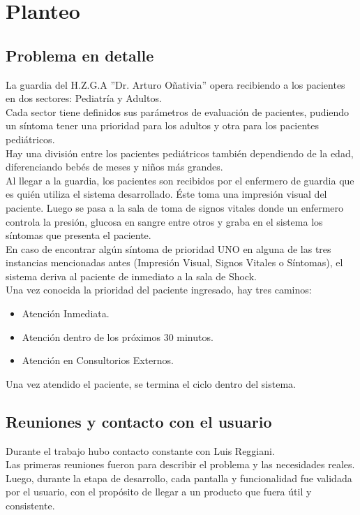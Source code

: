 \section{Planteo}
\subsection{Problema en detalle}
La guardia del H.Z.G.A ''Dr. Arturo Oñativia'' opera recibiendo a los pacientes en dos sectores: Pediatría y Adultos. \\
Cada sector tiene definidos sus parámetros de evaluación de pacientes, pudiendo un síntoma tener una prioridad para los adultos y otra para los pacientes pediátricos.\\
Hay una división entre los pacientes pediátricos también dependiendo de la edad, diferenciando bebés de meses y niños más grandes.\\
Al llegar a la guardia, los pacientes son recibidos por el enfermero de guardia que es quién utiliza el sistema desarrollado. Éste toma una impresión visual del paciente. Luego se pasa a la sala de toma de signos vitales donde un enfermero controla la presión, glucosa en sangre entre otros y graba en el sistema los síntomas que presenta el paciente. \\
En caso de encontrar algún síntoma de prioridad UNO en alguna de las tres instancias mencionadas antes (Impresión Visual, Signos Vitales o Síntomas), el sistema deriva al paciente de inmediato a la sala de Shock.  \\
Una vez conocida la prioridad del paciente ingresado, hay tres caminos: \\
\begin{itemize}
\item Atención Inmediata.
\item Atención dentro de los próximos 30 minutos. 
\item Atención en Consultorios Externos.
\end{itemize}
Una vez atendido el paciente, se termina el ciclo dentro del sistema.


\subsection{Reuniones y contacto con el usuario}

Durante el trabajo hubo contacto constante con Luis Reggiani.\\
Las primeras reuniones fueron para describir el problema y las necesidades reales. \\
Luego, durante la etapa de desarrollo, cada pantalla y funcionalidad fue validada por el usuario, con el propósito de llegar a un producto que fuera útil y consistente. \\


